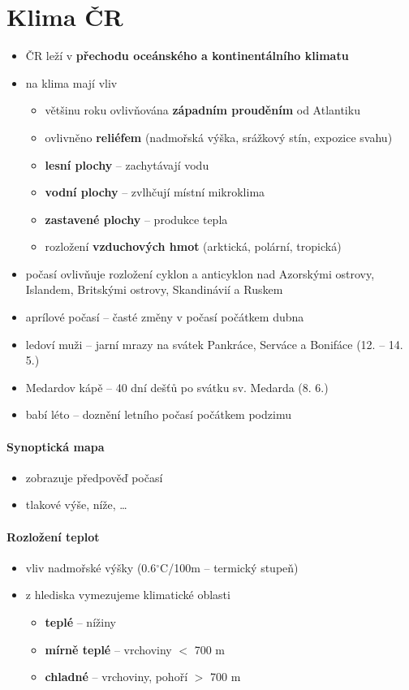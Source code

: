 \section{Klima ČR}
\begin{itemize}
\item ČR leží v \textbf{přechodu oceánského a kontinentálního klimatu}
\item na klima mají vliv
	\begin{itemize}
	\item většinu roku ovlivňována \textbf{západním prouděním} od Atlantiku
	\item ovlivněno \textbf{reliéfem} (nadmořská výška, srážkový stín, expozice svahu)
	\item \textbf{lesní plochy} -- zachytávají vodu 
	\item \textbf{vodní plochy} -- zvlhčují místní mikroklima
	\item \textbf{zastavené plochy} -- produkce tepla
	\item rozložení \textbf{vzduchových hmot} (arktická, polární, tropická)
	\end{itemize}
\item počasí ovlivňuje rozložení cyklon a anticyklon nad Azorskými ostrovy, Islandem, Britskými ostrovy, Skandinávií a Ruskem
\item aprílové počasí -- časté změny v počasí počátkem dubna
\item ledoví muži -- jarní mrazy na svátek Pankráce, Serváce a Bonifáce (12. -- 14. 5.)
\item Medardov kápě -- 40 dní dešťů po svátku sv. Medarda (8. 6.)
\item babí léto -- doznění letního počasí počátkem podzimu
\end{itemize}

\paragraph{Synoptická mapa}
\begin{itemize}
\item zobrazuje předpověď počasí
\item tlakové výše, níže, \ldots
\end{itemize}

\paragraph{Rozložení teplot}
\begin{itemize}
\item vliv nadmořské výšky (0.6$^\circ$C/100m -- termický stupeň)
\item z hlediska vymezujeme klimatické oblasti
	\begin{itemize}
	\item \textbf{teplé} -- nížiny
	\item \textbf{mírně teplé} -- vrchoviny $<$ 700 m
	\item \textbf{chladné} -- vrchoviny, pohoří $>$ 700 m
	\end{itemize}
\end{itemize}

